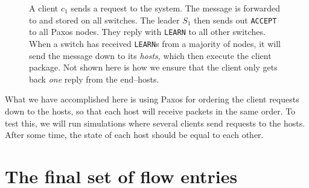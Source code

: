 \begin{figure}
  \centering
  \scriptsize
  \caption{A client $c_1$ sends a request to the system. The message is
    forwarded to and stored on all switches.  The leader $S_1$ then sends out
      \texttt{ACCEPT} to all Paxos nodes.  They reply with \texttt{LEARN} to
      all other switches.  When a switch has received \texttt{LEARN}s from a
      majority of nodes, it will send the message down to its
      \textit{hosts}, which then execute the client package.  Not shown here
      is how we ensure that the client only gets back \textit{one} reply
      from the end--hosts.}
  \label{flow:simple}
\end{figure}

What we have accomplished here is using Paxos for ordering the client
requests down to the hosts, so that each host will receive packets in the
same order.  To test this, we will run simulations where several clients
send requests to the hosts. After some time, the state of each host should
be equal to each other.

\section{The final set of flow entries}
\label{chapter:final.flowtable}



